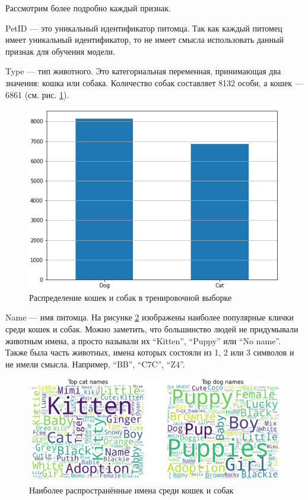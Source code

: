 \documentclass[14pt]{mmcs_article}
\begin{document}
Рассмотрим более подробно каждый признак.

PetID --- это уникальный идентификатор питомца. Так как каждый питомец имеет уникальный идентификатор, то не имеет смысла использовать данный признак для обучения модели.

Type --- тип животного. Это категориальная переменная, принимающая два значения: кошка или собака. Количество собак составляет 8132 особи, а кошек — 6861 (см. рис. \ref{analyse:type}).

\begin{figure}[H]
	\centering
	\includegraphics[scale=1.2]{type.png}
	\caption{Распределение кошек и собак в тренировочной выборке}\label{analyse:type}
\end{figure}

Name --- имя питомца. На рисунке \ref{analyse:names} изображены наиболее популярные клички среди кошек и собак. Можно заметить, что большинство людей не придумывали животным имена, а просто называли их “Kitten”, “Puppy” или “No name”. Также была часть животных, имена которых состояли из 1, 2 или 3 символов и не имели смысла. Например, “BB”, “C7C”, “Z4”. 

\begin{figure}[H]
	\centering
	\includegraphics[scale=0.45]{names.png}
	\caption{Наиболее распространённые имена среди кошек и собак}\label{analyse:names}
\end{figure}
\end{document}

